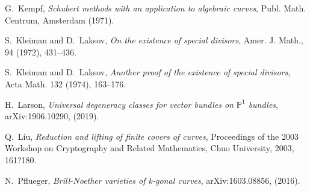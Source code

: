 \documentclass[12pt]{amsart}
\newcommand{\pp}{\mathbb{P}}
\theoremstyle{definition}
\theoremstyle{remark}
\theoremstyle{remark}
\numberwithin{equation}{section}
\begin{document}
\begin{thebibliography}{}
G.~Kempf, \textit{Schubert methods with an application to algebraic curves}, Publ. Math. Centrum, Amsterdam (1971).

S.~Kleiman and D.~Laksov, \textit{On the existence of special divisors}, Amer. J. Math., 94 (1972), 431--436.

S.~Kleiman and D.~Laksov, \textit{Another proof of the existence of special divisors}, Acta Math. 132 (1974), 163--176.

H.~Larson, \textit{Universal degeneracy classes for vector bundles on $\pp^1$ bundles}, arXiv:1906.10290, (2019).

Q.~Liu, \textit{Reduction and lifting of finite covers of curves}, Proceedings of the 2003 Workshop on Cryptography and Related Mathematics, Chuo University, 2003, 161?180.

N.~Pflueger, \textit{Brill-Noether varieties of k-gonal curves}, arXiv:1603.08856, (2016).

\end{thebibliography}
\end{document}
